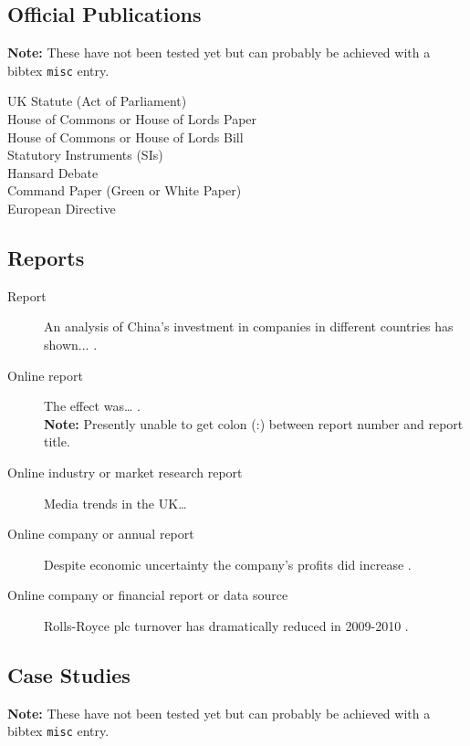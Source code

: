 \documentclass[12pt,oneside]{book} %
\begin{document}
\subsection{Official Publications}
\label{sec:officialPubs}
\textbf{Note:} These have not been tested yet but can probably be achieved with a bibtex \verb#misc# entry.
\begin{description}
\item[UK Statute (Act of Parliament)] 
\item[House of Commons or House of Lords Paper]
\item[House of Commons or House of Lords Bill]
\item[Statutory Instruments (SIs)]
\item[Hansard Debate]
\item[Command Paper (Green or White Paper)]
\item[European Directive]
\end{description}

\subsection{Reports}
\label{sec:Reports}
\begin{description}
\item[Report] An analysis of China’s investment in companies in different countries has shown... \cite{wolf_chinas_2011}.
\item[Online report] The effect was… \cite{curry_-flight_1989}.\\
\textbf{Note:} Presently unable to get colon (:) between report number and report title.
\item[Online industry or market research report] Media trends in the UK…\cite{marketline_media_2013}
\item[Online company or annual report] Despite economic uncertainty the
company’s profits did increase \cite{rolls-royce_group_plc_annual_2011}.
\item[Online company or financial report or data source] Rolls-Royce plc turnover has dramatically
reduced in 2009-2010 \cite{bureau_van_dijk_rolls-royce_2010}.
\end{description}


\subsection{Case Studies}
\textbf{Note:} These have not been tested yet but can probably be achieved with a bibtex \verb#misc# entry.
\end{document}
